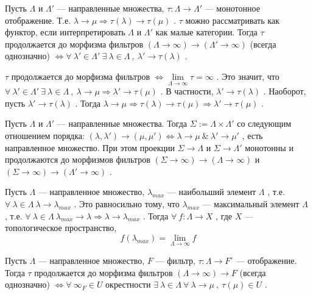 \SSsect Пусть \( \Lambda \) и \( \Lambda' \) --- направленные множества, \( \tau: \Lambda \rightarrow \Lambda' \) --- монотонное отображение. Т.е. \( \lambda \rightarrow \mu \Rightarrow \tau(\lambda) \rightarrow \tau(\mu) \) . \( \tau \) можно рассматривать как функтор, если интерпретировать \( \Lambda \) и \( \Lambda' \) как малые категории.
Тогда \( \tau \) продолжается до морфизма фильтров \( (\Lambda \rightarrow \infty) \rightarrow (\Lambda' \rightarrow \infty) \) (всегда однозначно) \( \Leftrightarrow  \forall~\lambda' \in \Lambda' ~\exists~\lambda \in \Lambda ~,~ \lambda' \rightarrow \tau(\lambda) \) .

\SSproof

\( \tau \) продолжается до морфизма фильтров \( \Leftrightarrow \lim\limits_{\Lambda \rightarrow \infty} \tau = \infty \) . Это значит, что \( \forall~\lambda' \in \Lambda' ~\exists~\lambda \in \Lambda ~,~ \lambda \rightarrow \mu \Rightarrow \lambda' \rightarrow \tau(\mu) \) . В частности, \( \lambda' \rightarrow \tau(\lambda) \) . Наоборот, пусть \( \lambda' \rightarrow \tau(\lambda) \) . Тогда \( \lambda \rightarrow \mu \Rightarrow \tau(\lambda) \rightarrow \tau(\mu) \Rightarrow \lambda' \rightarrow \tau(\mu) \) .

\SSendp

\SSsect Пусть \( \Lambda \) и \( \Lambda' \) --- направленные множества. Тогда \( \Sigma := \Lambda \times \Lambda' \) со следующим отношением порядка: \( (\lambda,\lambda') \rightarrow (\mu,\mu') \Leftrightarrow \lambda \rightarrow \mu ~\&~  \lambda' \rightarrow \mu' \) , есть направленное множество. При этом проекции \( \Sigma \rightarrow \Lambda \) и \( \Sigma \rightarrow \Lambda' \) монотонны и продолжаются до морфизмов фильтров \( (\Sigma \rightarrow \infty) \rightarrow (\Lambda \rightarrow \infty) \) и \( (\Sigma \rightarrow \infty) \rightarrow (\Lambda' \rightarrow \infty) \) .

\SSsect Пусть \( \Lambda \) --- направленное множество, \( \lambda_{max} \) --- наибольший элемент \( \Lambda \) , т.е. \( \forall~\lambda \in \Lambda~ \lambda \rightarrow \lambda_{max} \) . Это равносильно тому, что \( \lambda_{max} \) --- максимальный элемент \( \Lambda \) , т.е. \( \forall~\lambda \in \Lambda~ \lambda_{max} \rightarrow \lambda \Rightarrow \lambda \rightarrow \lambda_{max} \) .
Тогда \( \forall~ f:\Lambda \rightarrow X \) , где \( X \) --- топологическое пространство,
\[ f(\lambda_{max}) = \lim\limits_{\Lambda \rightarrow \infty} f \]

\SSsect Пусть \( \Lambda \) --- направленное множество, \( F \) --- фильтр, \( \tau:\Lambda \rightarrow F^{\circ} \) --- отображение. Тогда \( \tau \) продолжается до морфизма фильтров \( (\Lambda \rightarrow \infty) \rightarrow F \) (всегда однозначно) \( \Leftrightarrow \forall~ \infty_F \in U \) окрестности \( \exists~\lambda \in \Lambda ~\forall~\lambda \rightarrow \mu ~,~ \tau(\mu) \in U \) .

